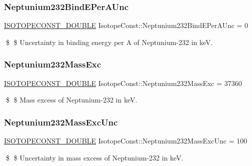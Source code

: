 \subsubsection{\texorpdfstring{Neptunium232\+Bind\+E\+Per\+A\+Unc}{Neptunium232BindEPerAUnc}}
{\footnotesize\ttfamily \mbox{\hyperlink{group___isotope_const-_macros_ga8f45a7272ce02c0b4c65c44636ed719a}{I\+S\+O\+T\+O\+P\+E\+C\+O\+N\+S\+T\+\_\+\+D\+O\+U\+B\+LE}} Isotope\+Const\+::\+Neptunium232\+Bind\+E\+Per\+A\+Unc = 0}

\$ \$ Uncertainty in binding energy per A of Neptunium-\/232 in keV. \mbox{\label{group___isotope_const-_neptunium-_np232_gaf58614ed565d967f793e6b57b1016778}} 
\subsubsection{\texorpdfstring{Neptunium232\+Mass\+Exc}{Neptunium232MassExc}}
{\footnotesize\ttfamily \mbox{\hyperlink{group___isotope_const-_macros_ga8f45a7272ce02c0b4c65c44636ed719a}{I\+S\+O\+T\+O\+P\+E\+C\+O\+N\+S\+T\+\_\+\+D\+O\+U\+B\+LE}} Isotope\+Const\+::\+Neptunium232\+Mass\+Exc = 37360}

\$ \$ Mass excess of Neptunium-\/232 in keV. \mbox{\label{group___isotope_const-_neptunium-_np232_ga1f593476b4beb713295d569b8fb7ee3a}} 
\subsubsection{\texorpdfstring{Neptunium232\+Mass\+Exc\+Unc}{Neptunium232MassExcUnc}}
{\footnotesize\ttfamily \mbox{\hyperlink{group___isotope_const-_macros_ga8f45a7272ce02c0b4c65c44636ed719a}{I\+S\+O\+T\+O\+P\+E\+C\+O\+N\+S\+T\+\_\+\+D\+O\+U\+B\+LE}} Isotope\+Const\+::\+Neptunium232\+Mass\+Exc\+Unc = 100}

\$ \$ Uncertainty in mass excess of Neptunium-\/232 in keV. \mbox{\label{group___isotope_const-_neptunium-_np232_gab6e58a78024547a535317040dc616247}} 
